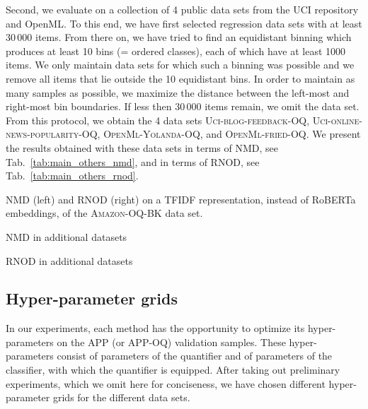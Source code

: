 \documentclass[10pt,a4paper]{article}
\begin{document}
Second, we evaluate on a collection of 4 public data sets from the UCI repository and OpenML. To this end, we have first selected regression data sets with at least 30\,000 items. From there on, we have tried to find an equidistant binning which produces at least 10 bins (= ordered classes), each of which have at least 1000 items. We only maintain data sets for which such a binning was possible and we remove all items that lie outside the 10 equidistant bins. In order to maintain as many samples as possible, we maximize the distance between the left-most and right-most bin boundaries. If less then 30\,000 items remain, we omit the data set. From this protocol, we obtain the 4 data sets \textsc{Uci-blog-feedback-OQ}, \textsc{Uci-online-news-popularity-OQ}, \textsc{OpenMl-Yolanda-OQ}, and \textsc{OpenMl-fried-OQ}. We present the results obtained with these data sets in terms of NMD, see Tab.~\ref{tab:main_others_nmd}, and in terms of RNOD, see Tab.~\ref{tab:main_others_rnod}.

\begin{table}
  \centering
  \caption{NMD (left) and RNOD (right) on a TFIDF representation, instead of RoBERTa embeddings, of the \textsc{Amazon-OQ-BK} data set.}
  \label{tab:tfidf}
  \scriptsize
  \begin{minipage}{.49\textwidth}
    
  \end{minipage}%
  \begin{minipage}{.49\textwidth}
    
  \end{minipage}
\end{table}

\begin{table}
  \centering
  \caption{NMD in additional datasets}
  \label{tab:main_others_nmd}
  \resizebox{\textwidth}{!}{
    
  }%
\end{table}

\begin{table}
  \centering
  \caption{RNOD in additional datasets}
  \label{tab:main_others_rnod}
  \resizebox{\textwidth}{!}{
    
  }%
\end{table}


\subsection{Hyper-parameter grids}

In our experiments, each method has the opportunity to optimize its hyper-parameters on the APP (or APP-OQ) validation samples. These hyper-pa\-ra\-me\-ters consist of parameters of the quantifier and of parameters of the classifier, with which the quantifier is equipped. After taking out preliminary experiments, which we omit here for conciseness, we have chosen different hyper-parameter grids for the different data sets.
\end{document}
